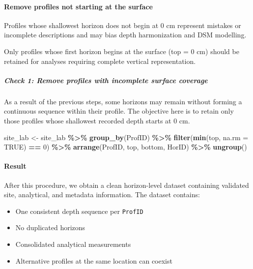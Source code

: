 \documentclass[
  10pt,
  b5paper,
  oneside]{book}
\newenvironment{Shaded}{\begin{snugshade}}{\end{snugshade}}
\newcommand{\AttributeTok}[1]{\textcolor[rgb]{0.13,0.29,0.53}{#1}}
\newcommand{\ConstantTok}[1]{\textcolor[rgb]{0.56,0.35,0.01}{#1}}
\newcommand{\DecValTok}[1]{\textcolor[rgb]{0.00,0.00,0.81}{#1}}
\newcommand{\FunctionTok}[1]{\textcolor[rgb]{0.13,0.29,0.53}{\textbf{#1}}}
\newcommand{\NormalTok}[1]{#1}
\newcommand{\OtherTok}[1]{\textcolor[rgb]{0.56,0.35,0.01}{#1}}
\newcommand{\SpecialCharTok}[1]{\textcolor[rgb]{0.81,0.36,0.00}{\textbf{#1}}}
\providecommand{\tightlist}{%
  \setlength{\itemsep}{0pt}\setlength{\parskip}{0pt}}
\begin{document}
\paragraph*{Remove profiles not starting at the surface}\label{remove-profiles-not-starting-at-the-surface}

Profiles whose shallowest horizon does not begin at 0 cm represent mistakes or incomplete descriptions and may bias depth harmonization and DSM modelling.

Only profiles whose first horizon begins at the surface (top = 0 cm) should be retained for analyses requiring complete vertical representation.

\subparagraph*{Check 1: Remove profiles with incomplete surface coverage}\label{check-1-remove-profiles-with-incomplete-surface-coverage}

As a result of the previous steps, some horizons may remain without forming a continuous sequence within their profile. The objective here is to retain only those profiles whose shallowest recorded depth starts at 0 cm.

\begin{Shaded}
\begin{Highlighting}[]
\NormalTok{site\_lab }\OtherTok{\textless{}{-}}\NormalTok{ site\_lab }\SpecialCharTok{\%\textgreater{}\%}
  \FunctionTok{group\_by}\NormalTok{(ProfID) }\SpecialCharTok{\%\textgreater{}\%}
  \FunctionTok{filter}\NormalTok{(}\FunctionTok{min}\NormalTok{(top, }\AttributeTok{na.rm =} \ConstantTok{TRUE}\NormalTok{) }\SpecialCharTok{==} \DecValTok{0}\NormalTok{) }\SpecialCharTok{\%\textgreater{}\%}   
  \FunctionTok{arrange}\NormalTok{(ProfID, top, bottom, HorID) }\SpecialCharTok{\%\textgreater{}\%}
  \FunctionTok{ungroup}\NormalTok{()}
\end{Highlighting}
\end{Shaded}

\paragraph*{Result}\label{result}

After this procedure, we obtain a clean horizon-level dataset containing validated site, analytical, and metadata information. The dataset contains:

\begin{itemize}
\tightlist
\item
  One consistent depth sequence per \texttt{ProfID}\\
\item
  No duplicated horizons
\item
  Consolidated analytical measurements
\item
  Alternative profiles at the same location can coexist
\end{itemize}
\end{document}
